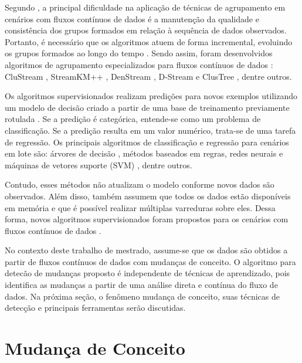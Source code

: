 \documentclass[qual, classic, a4paper]{ufbathesis}
\begin{document}
Segundo \cite{Gama:2010:KDD:1855075}, a principal dificuldade na aplicação de técnicas de agrupamento em cenários com fluxos contínuos de dados  
é a manutenção da qualidade e consistência dos grupos formados em relação à sequência de dados observados. 
Portanto, é necessário que os algoritmos atuem de forma incremental, evoluindo os grupos formados ao longo do tempo \cite{Barbara:2002:RCD:507515.507519}.
Sendo assim, foram desenvolvidos algoritmos de agrupamento especializados para fluxos contínuos de dados \cite{Aggarwal:2003:FCE:1315451.1315460}:
CluStream \cite{Aggarwal:2003:FCE:1315451.1315460},
StreamKM++ \cite{Ackermann:2012:SCA:2133803.2184450},
DenStream \cite{Cao:Feng:Ester},
D-Stream \cite{Chen:Tu} e ClusTree \cite{Kranen:2011:CIM:2134350.2134352}, dentre outros.

Os algoritmos supervisionados realizam predições para novos exemplos utilizando um modelo de decisão criado a partir de uma base de treinamento previamente rotulada \cite{Kotsiantis:2007:SML:1566770.1566773}.
Se a predição é categórica, entende-se como um problema de classificação.
Se a predição resulta em um valor numérico, trata-se de uma tarefa de regressão.
Os principais algoritmos de classificação e regressão para cenários em lote são:
árvores de decisão \cite{Breiman:Classification_Regression_Trees},
métodos baseados em regras, 
redes neurais e máquinas de vetores suporte (SVM) \cite{Vapnik1998}, 
dentre outros.

Contudo, esses métodos não atualizam o modelo conforme novos dados são observados.
Além disso, também assumem que todos os dados estão disponíveis em memória e que é possível realizar múltiplas varreduras sobre eles.
Dessa forma, novos algoritmos supervisionados foram propostos para os cenários com fluxos contínuos de dados \cite{Domingos:2000:MHD:347090.347107, Bifet:2013:EDS:2480362.2480516, Wang:2003:MCD:956750.956778, Aggarwal:2004:DCD:1014052.1014110, Gama:2003:ADT:956750.956813}.

No contexto deste trabalho de mestrado, assume-se que os dados são obtidos a partir de fluxos contínuos de dados com mudanças de conceito.
O algoritmo para detecão de mudanças proposto é independente de técnicas de aprendizado, 
pois identifica as mudanças a partir de uma análise direta e contínua do fluxo de dados.
Na próxima seção, o fenômeno mudança de conceito, suas técnicas de detecção e principais ferramentas serão discutidas.

\section{Mudança de Conceito}
\end{document}

